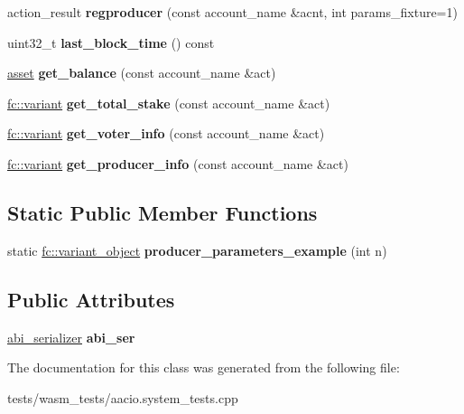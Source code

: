 \begin{DoxyCompactItemize}
\item 
\mbox{\label{classaacio__system__tester_a80be3d4dafe5199326ead3e8d3840ee4}} 
action\+\_\+result {\bfseries regproducer} (const account\+\_\+name \&acnt, int params\+\_\+fixture=1)
\item 
\mbox{\label{classaacio__system__tester_acffabf89ef4b5f131f8855238ca61df1}} 
uint32\+\_\+t {\bfseries last\+\_\+block\+\_\+time} () const
\item 
\mbox{\label{classaacio__system__tester_a4adad89d43490b877338a009304faa50}} 
\mbox{\hyperlink{structaacio_1_1asset}{asset}} {\bfseries get\+\_\+balance} (const account\+\_\+name \&act)
\item 
\mbox{\label{classaacio__system__tester_ab0481ec03c3933a339112b92fa19d780}} 
\mbox{\hyperlink{classfc_1_1variant}{fc\+::variant}} {\bfseries get\+\_\+total\+\_\+stake} (const account\+\_\+name \&act)
\item 
\mbox{\label{classaacio__system__tester_a3900a9c6b5fa958d59d2d25e74693817}} 
\mbox{\hyperlink{classfc_1_1variant}{fc\+::variant}} {\bfseries get\+\_\+voter\+\_\+info} (const account\+\_\+name \&act)
\item 
\mbox{\label{classaacio__system__tester_a162d6eacf226824cff6f60a2f0c06558}} 
\mbox{\hyperlink{classfc_1_1variant}{fc\+::variant}} {\bfseries get\+\_\+producer\+\_\+info} (const account\+\_\+name \&act)
\end{DoxyCompactItemize}
\subsection*{Static Public Member Functions}
\begin{DoxyCompactItemize}
\item 
\mbox{\label{classaacio__system__tester_ac162e85c3beec62f6df055f7b998d922}} 
static \mbox{\hyperlink{classfc_1_1variant__object}{fc\+::variant\+\_\+object}} {\bfseries producer\+\_\+parameters\+\_\+example} (int n)
\end{DoxyCompactItemize}
\subsection*{Public Attributes}
\begin{DoxyCompactItemize}
\item 
\mbox{\label{classaacio__system__tester_a75ad6f427f0eb36387de7454f9d4c258}} 
\mbox{\hyperlink{structaacio_1_1chain_1_1contracts_1_1abi__serializer}{abi\+\_\+serializer}} {\bfseries abi\+\_\+ser}
\end{DoxyCompactItemize}


The documentation for this class was generated from the following file\+:\begin{DoxyCompactItemize}
\item 
tests/wasm\+\_\+tests/aacio.\+system\+\_\+tests.\+cpp\end{DoxyCompactItemize}
